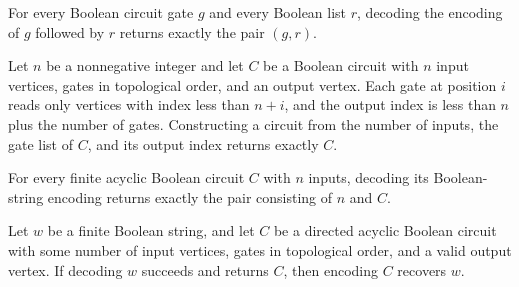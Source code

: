 \begin{theorem}
\label{BoolCircuit.DAGGate.decode_encode}
\leanok
{}
For every Boolean circuit gate $g$ and every Boolean list $r$, decoding the encoding of
$g$ followed by $r$ returns exactly the pair $(g,r)$.
\end{theorem}

\begin{theorem}
\label{BoolCircuit.DAGCircuit.ofParts_self}
\leanok
{}
Let $n$ be a nonnegative integer and let $C$ be a Boolean circuit with $n$ input
vertices, gates in topological order, and an output vertex. Each gate at position $i$
reads only vertices with index less than $n+i$, and the output index is less than $n$
plus the number of gates. Constructing a circuit from the number of inputs, the gate
list of $C$, and its output index returns exactly $C$.
\end{theorem}

\begin{theorem}
\label{BoolCircuit.DAGCircuit.decode_encode}
\leanok
{}
For every finite acyclic Boolean circuit $C$ with $n$ inputs, decoding its
Boolean-string encoding returns exactly the pair consisting of $n$ and $C$.
\end{theorem}

\begin{theorem}
\label{BoolCircuit.DAGCircuit.encode_of_decode}
\leanok
{}
Let $w$ be a finite Boolean string, and let $C$ be a directed acyclic Boolean circuit
with some number of input vertices, gates in topological order, and a valid output
vertex. If decoding $w$ succeeds and returns $C$, then encoding $C$ recovers $w$.
\end{theorem}

